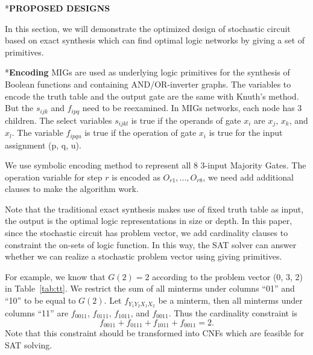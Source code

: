 \documentclass[conference,letterpaper]{IEEEtran}
\makeatletter
\renewcommand{\section}{\@startsection{section}{1}{0mm}
    {-\baselineskip}{0.001\baselineskip}{\bf\leftline}}
\renewcommand{\subsection}{\@startsection{subsection}{1}{0mm}
	{-\baselineskip}{0.001\baselineskip}{\bf\leftline}}
\makeatother
\begin{document}
\section*{\textbf{\large PROPOSED DESIGNS}}

In this section, we will demonstrate the optimized design of stochastic circuit based on exact synthesis which can find optimal logic networks by giving a set of primitives.
\subsection*{\textbf{Encoding }}
MIGs are used as underlying logic primitives for the synthesis of Boolean functions and containing AND/OR-inverter graphs. The variables to encode the truth table and the output gate are the same with Knuth’s method. 
But the ${s}_{i j k}$ and $f_{i p q}$ need to be reexamined. In MIGs networks, each node has 3 children. The select variables ${s}_{i j k l}$ is true if the operands of gate $x_{i}$ are $x_{j}$, $x_{k}$, and $x_{l}$.  The
variable $f_{i p q u}$ is true if the operation of gate $x_{i}$ is true for the input assignment (p, q, u).

We use symbolic encoding method to represent all 8 3-input Majority Gates. The operation variable for step $r$ is encoded as $O_{r 1},...,O_{r 8}$, we need add additional  clauses to make the algorithm work.



Note that the traditional exact synthesis makes use of fixed truth table as input, the output is the optimal logic representations in size or depth.
In this paper, since the stochastic circuit has problem vector, we add cardinality clauses to constraint the on-sets of logic function. In this way, the SAT solver can answer whether we can realize a stochastic problem vector using giving primitives. 

For example, we know that $G(2) = 2$ according to the problem vector (0, 3, 2) in Table~\ref{tab:tt}. We restrict the sum of all minterms under columns ``01'' and ``10'' to be equal to $G(2)$. 
Let $f_{Y_1Y_2X_1X_2}$ be a minterm, then all minterms under columns ``11''
are $f_{0011}$, $f_{0111}$, $f_{1011}$, and $f_{0011}$.
Thus the cardinality constraint is \vspace{-0.5ex}
\begin{equation}
f_{0011} + f_{0111} + f_{1011} + f_{0011} = 2.
\end{equation}
Note that this constraint should be transformed into CNFs which are feasible for SAT solving.
\end{document}
